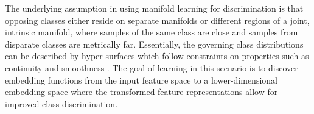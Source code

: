 The underlying assumption in using manifold learning for discrimination is that opposing classes either reside on separate manifolds or different regions of a joint, intrinsic manifold, where samples of the same class are close and samples from disparate classes are metrically far.  Essentially, the governing class distributions can be described by hyper-surfaces which follow constraints on properties such as continuity and smoothness \cite{Belkin2004SemiSupLearningRiemannianManifolds}.  The goal of learning in this scenario is to discover embedding functions from the input feature space to a lower-dimensional embedding space where the transformed feature representations allow for improved class discrimination.



